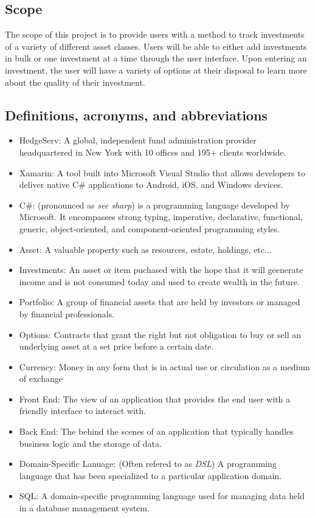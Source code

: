 \documentclass[onecolumn, draftclsnofoot,10pt, compsoc]{IEEEtran}
\begin{document}
\subsection{Scope}
The scope of this project is to provide users with a method to track investments of a variety of different asset classes. Users will be able to either add investments in bulk or one investment at a time through the user interface. Upon entering an investment, the user will have a variety of options at their disposal to learn more about the quality of their investment.

\subsection{Definitions, acronyms, and abbreviations}
\begin{itemize}
	\item HedgeServ: A global, independent fund administration provider headquartered in New York with
		10 offices and 195+ clients worldwide.
	\item Xamarin: A tool built into Microsoft Visual Studio that allows developers to deliver native 
	   	C\# applications to Android, iOS, and Windows devices.
	\item C\#: (pronounced as \textit{see sharp}) is a programming language developed by Microsoft. It encompasses strong typing, imperative, declarative, functional, generic,
		object-oriented, and component-oriented programming styles.
	\item Asset: A valuable property such as resources, estate, holdings, etc...
	\item Investments: An asset or item puchased with the hope that it will geenerate income and is not consumed today and used to create wealth in the future.
	\item Portfolio: A group of financial assets that are held by investors or managed by financial professionals.
	\item Options: Contracts that grant the right but not obligation to buy or sell an underlying asset at a set price before a certain date.
	\item Currency: Money in any form that is in actual use or circulation as a medium of exchange
	\item Front End: The view of an application that provides the end user with a friendly interface to interact with.
	\item Back End: The behind the scenes of an application that typically handles business logic and the storage of data.
	\item Domain-Specific Lanuage: (Often refered to as \textit{DSL}) A programming language that has been specialized to a particular application domain.
	\item SQL: A domain-specific programming language used for managing data held in a database management system.
\end{itemize}
\end{document}
